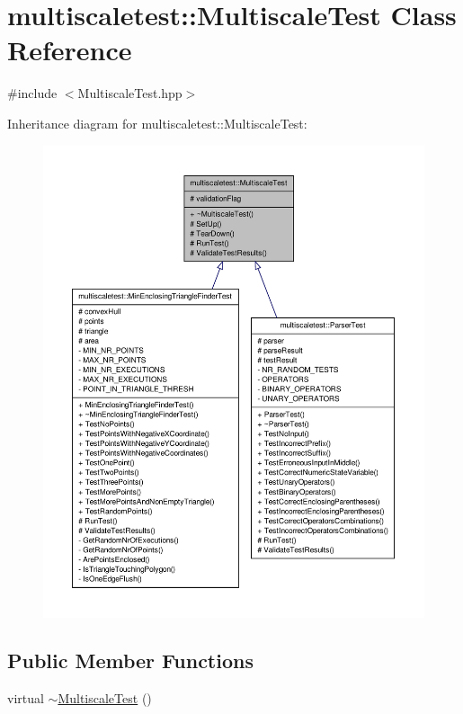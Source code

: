 \hypertarget{classmultiscaletest_1_1MultiscaleTest}{\section{multiscaletest\-:\-:\-Multiscale\-Test \-Class \-Reference}
\label{classmultiscaletest_1_1MultiscaleTest}
}


{\ttfamily \#include $<$\-Multiscale\-Test.\-hpp$>$}



\-Inheritance diagram for multiscaletest\-:\-:\-Multiscale\-Test\-:\nopagebreak
\begin{figure}[H]
\begin{center}
\leavevmode
\includegraphics[width=350pt]{classmultiscaletest_1_1MultiscaleTest__inherit__graph}
\end{center}
\end{figure}
\subsection*{\-Public \-Member \-Functions}
\begin{DoxyCompactItemize}
\item 
virtual \hyperlink{classmultiscaletest_1_1MultiscaleTest_a27aa0fd218670e2265edad84b2fb1f8f}{$\sim$\-Multiscale\-Test} ()
\end{DoxyCompactItemize}
